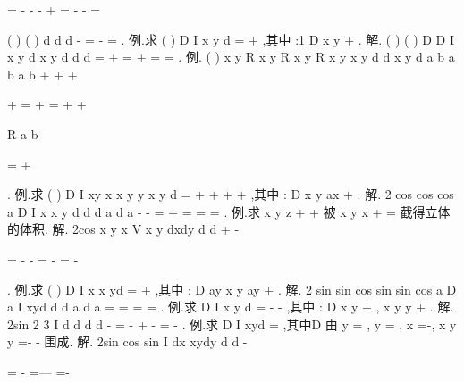 =
-
-
-
+
=
-
-
=


\int \int 
\int \int 
(
)
(
)
d
d
d
\pi 
\theta 
\rho 
\rho \rho 
\pi 
\rho 
\rho \rho 
\pi 
-
=
-
=
\int 
\int 
\int 
. 
\textcolor{lyred}{例}.求
(
)
D
I
x
y
d\sigma 
=
+
\int \int 
,其中
:1
D
x
y
\le 
+
\le 
. 
解.
(
)
(
)
D
D
I
x
y
d
x
y
d
d
d
\pi 
\pi 
\sigma 
\sigma 
\theta \rho 
\rho \rho 
=
+
=
+
=
\cdots 
=
\int \int 
\int \int 
\int 
\int 
. 
\textcolor{lyred}{例}.
(
)
x
y
R
x
y
R
x
y
R
x
y
x
y
d
d
x
y
d
a
b
a
b
a
b
\sigma 
\sigma 
\sigma 
+
\le 
+
\le 
+
\le 






+
=
+
=
+
+












\int \int 
\int \int 
\int \int 
R
a
b
\pi 


=
+




. 
\textcolor{lyred}{例}.求
(
)
D
I
xy
x x
y
y
x
y
d\sigma 
=
+
+
+
+
\int \int 
,其中
:
D x
y
ax
+
\le 
. 
解.
2 cos
cos
cos
a
D
I
x x
y d
d
d
a
d
a
\pi 
\pi 
\theta 
\pi 
\pi 
\sigma 
\theta 
\rho 
\theta \rho \rho \rho 
\theta \theta 
-
-
=
+
=
\cdots 
\cdots 
=
=
\int \int 
\int 
\int 
\int 
. 
\textcolor{lyred}{例}.求
x
y
z
+
+
\le 
被
x
y
x
+
=
截得立体的体积. 
解.
2cos
x
y
x
V
x
y dxdy
d
d
\pi 
\theta 
\pi 
\pi 
\theta 
\rho 
\rho \rho 
+
\le 
-


=
-
-
=
-
\cdots 
=
-




\int \int 
\int 
\int 
. 
\textcolor{lyred}{例}.求
(
)
D
I
x
x yd\sigma 
=
+
\int \int 
,其中
:
D ay
x
y
ay
\le 
+
\le 
. 
解.
2 sin
sin
cos sin
sin
cos
a
D
a
I
xyd
d
d
a
d
a
\pi 
\pi 
\theta 
\theta 
\sigma 
\theta 
\rho 
\theta 
\theta \rho \rho 
\theta 
\theta \theta 
=
=
\cdots 
=
=
\int \int 
\int 
\int 
\int 
. 
\textcolor{lyred}{例}.求
D
I
x
y d\sigma 
=
-
-
\int \int 
,其中
:
D x
y
+
\le ,
x
y
y
+
\le 
. 
解.
2sin
2 3
I
d
d
d
d
\pi 
\pi 
\theta 
\pi 
\theta 
\rho \rho \rho 
\theta 
\rho \rho \rho 
\pi 
-
=
-
+
-
=
-
\int 
\int 
\int 
\int 
. 
\textcolor{lyred}{例}.求
D
I
xyd\sigma 
=\int \int 
,其中D 由
y =
,
y =
,
x =-,
x
y
y
=-
-
围成. 
解.
2sin
cos sin
I
dx xydy
d
d
\pi 
\theta 
\pi 
\theta 
\rho 
\theta 
\theta \rho \rho 
-


=
-
\cdots 
=---
=-




